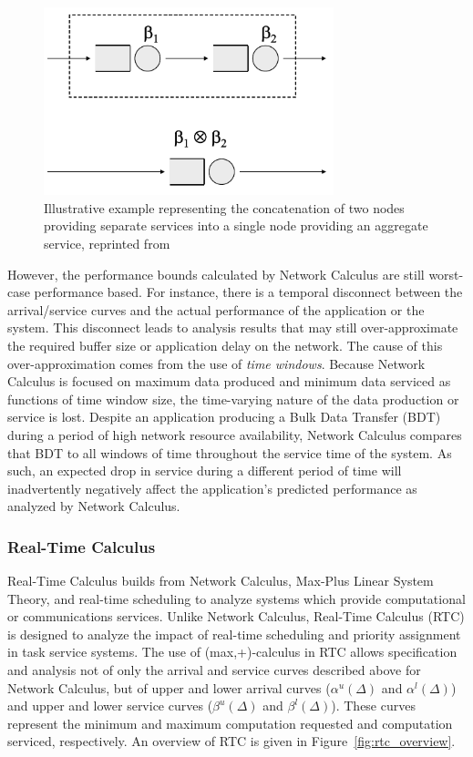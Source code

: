 \begin{figure}[htb]
  \centering
  \includegraphics[width=0.75\textwidth]{figs/nc_concatenation.png}
  \caption{Illustrative example representing the concatenation of two
    nodes providing separate services into a single node providing an
    aggregate service, reprinted from \cite{NCBook}}
  \label{fig:nc_concatenation}
\end{figure}

However, the performance bounds calculated by Network Calculus are
still worst-case performance based.  For instance, there is a temporal
disconnect between the arrival/service curves and the actual
performance of the application or the system.  This disconnect leads
to analysis results that may still over-approximate the required
buffer size or application delay on the network.  The cause of this
over-approximation comes from the use of \emph{time windows}.  Because
Network Calculus is focused on maximum data produced and minimum data
serviced as functions of time window size, the time-varying nature of
the data production or service is lost.  Despite an application
producing a Bulk Data Transfer (BDT) during a period of high network
resource availability, Network Calculus compares that BDT to all
windows of time throughout the service time of the system.  As such,
an expected drop in service during a different period of time will
inadvertently negatively affect the application's predicted
performance as analyzed by Network Calculus.

\subsubsection{Real-Time Calculus}
Real-Time Calculus\cite{Thiele00real-timecalculus} builds from Network
Calculus, Max-Plus Linear System Theory, and real-time scheduling to
analyze systems which provide computational or communications
services.  Unlike Network Calculus, Real-Time Calculus (RTC) is
designed to analyze the impact of real-time scheduling and priority
assignment in task service systems.  The use of (max,+)-calculus in
RTC allows specification and analysis not of only the arrival and
service curves described above for Network Calculus, but of upper and
lower arrival curves ($\alpha^u(\Delta)$ and $\alpha^l(\Delta)$) and
upper and lower service curves ($\beta^u(\Delta)$ and
$\beta^l(\Delta)$).  These curves represent the minimum and maximum
computation requested and computation serviced, respectively.  An
overview of RTC is given in Figure~\ref{fig:rtc_overview}.

